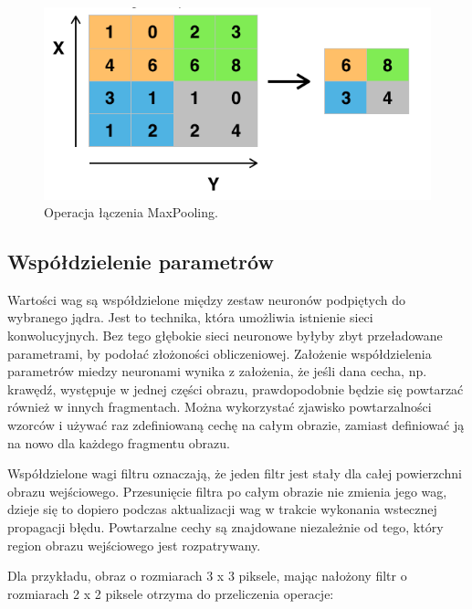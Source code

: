 \documentclass[12pt,a4paper,twoside,titlepage,openright]{book}
\begin{document}
\begin{itemize}
\begin{itemize}
\begin{figure}[ht]
	\centering
			\includegraphics[resolution=100, scale=0.6]{MaxPooling.png}
		\caption{Operacja łączenia MaxPooling.}
\end{figure}

\subsection{Współdzielenie parametrów}
Wartości wag są współdzielone między zestaw neuronów podpiętych do wybranego jądra. Jest to technika, która umożliwia istnienie sieci konwolucyjnych. Bez tego głębokie sieci neuronowe byłyby zbyt przeładowane parametrami, by podołać złożoności obliczeniowej. Założenie współdzielenia parametrów miedzy neuronami wynika z założenia, że jeśli dana cecha, np. krawędź, występuje w jednej części obrazu, prawdopodobnie będzie się powtarzać również w innych fragmentach. Można wykorzystać zjawisko powtarzalności wzorców i używać raz zdefiniowaną cechę na całym obrazie, zamiast definiować ją na nowo dla każdego fragmentu obrazu.

Współdzielone wagi filtru oznaczają, że jeden filtr jest stały dla całej powierzchni obrazu wejściowego. Przesunięcie filtra po całym obrazie nie zmienia jego wag, dzieje się to dopiero podczas aktualizacji wag w trakcie wykonania wstecznej propagacji błędu. Powtarzalne cechy są znajdowane niezależnie od tego, który region obrazu wejściowego jest rozpatrywany.

Dla przykładu, obraz o rozmiarach 3 x 3 piksele, mając nałożony filtr o rozmiarach 2 x 2 piksele otrzyma do przeliczenia operacje:


\end{itemize}
\end{itemize}
\end{document}
